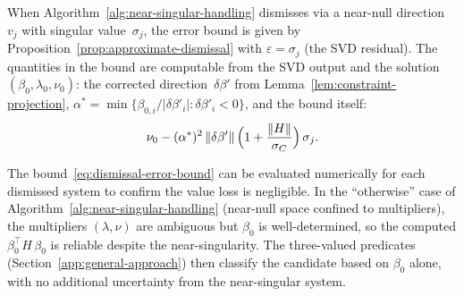 \begin{remark}%
\label{rem:dismissal-error-bound}
When Algorithm~\ref{alg:near-singular-handling}
dismisses via a near-null direction~$v_j$ with singular
value~$\sigma_j$, the error bound is given by
Proposition~\ref{prop:approximate-dismissal} with
$\varepsilon = \sigma_j$ (the SVD residual).
The quantities in the bound are computable from the SVD
output and the solution $(\beta_0, \lambda_0, \nu_0)$:
the corrected direction~$\delta\beta'$ from
Lemma~\ref{lem:constraint-projection},
$\alpha^* = \min\{\beta_{0,i}/|\delta\beta'_i|
: \delta\beta'_i < 0\}$,
and the bound itself:
\begin{equation}\label{eq:dismissal-error-bound}
  \nu_0
    - (\alpha^*)^2\,\|\delta\beta'\|\,
      \Bigl(1 + \frac{\|H\|}{\sigma_C}\Bigr)\,\sigma_j.
\end{equation}
\end{remark}

\begin{remark}%
\label{rem:approximate-dismissal-algorithm}
The bound~\eqref{eq:dismissal-error-bound} can be evaluated
numerically for each dismissed system to confirm the value
loss is negligible.
In the ``otherwise'' case of
Algorithm~\ref{alg:near-singular-handling} (near-null space
confined to multipliers),
the multipliers $(\lambda, \nu)$ are ambiguous but $\beta_0$
is well-determined, so the computed
$\beta_0^\top H\,\beta_0$ is reliable despite the
near-singularity.
The three-valued predicates
(Section~\ref{app:general-approach}) then classify the
candidate based on $\beta_0$ alone, with no additional
uncertainty from the near-singular system.
\end{remark}

